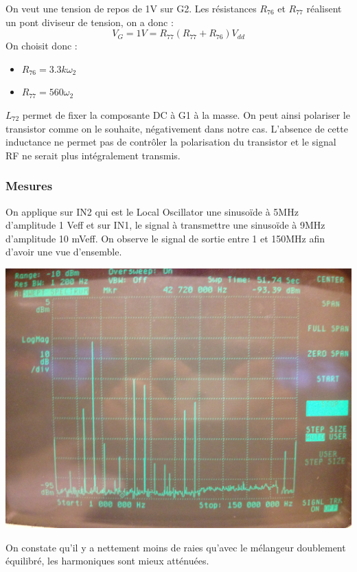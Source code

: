 \documentclass{article}
\begin{document}

On veut une tension de repos de 1V sur G2.
Les résistances $R_{76}$ et $R_{77}$ réalisent un pont diviseur de tension, on a donc :
\begin{equation*}
V_{G}=1V={R_{77}}{(R_{77}+R_{76})}V_{dd}
\end{equation*}
On choisit donc :
\begin{itemize}
\item $R_{76}= 3.3 k \omega_{2}$
\item $R_{77}= 560 \omega_{2}$
\end{itemize}


$L_{72}$ permet de fixer la composante DC à G1 à la masse. On peut ainsi polariser le transistor comme on le souhaite, négativement dans notre cas. L'absence de cette inductance ne permet pas de contrôler la polarisation du transistor et le signal RF ne serait plus intégralement transmis.

\subsubsection{Mesures}


On applique sur IN2 qui est le Local Oscillator une sinusoïde à 5MHz d'amplitude  1 Veff  et sur IN1, le signal à transmettre une sinusoïde à 9MHz d'amplitude 10 mVeff.
On observe le signal de sortie entre 1 et 150MHz afin d'avoir une vue d'ensemble.
\begin{center}
\includegraphics[width=0.7\linewidth]{10_3_1.jpg}
\end{center}
On constate qu'il y a nettement moins de raies qu'avec le mélangeur doublement équilibré, les harmoniques sont mieux atténuées.

\end{document}
